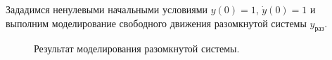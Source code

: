\documentclass[a5paper, 10pt]{article}
\theoremstyle{definition}
\theoremstyle{plain}
\theoremstyle{remark}
\begin{document}
\newpage
Зададимся ненулевыми начальными условиями $y(0) = 1$, $\dot{y} (0) = 1$ и выполним моделирование свободного движения разомкнутой системы $y_{\text{раз}}$.

\begin{figure}[h!]
\caption{Результат моделирования разомкнутой системы.}
\end{figure}
\end{document}
